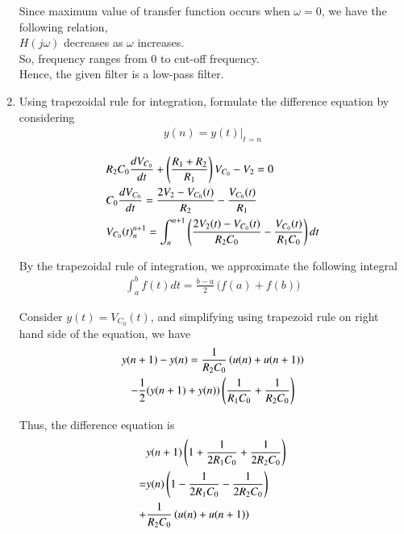 \documentclass[journal,12pt,twocolumn]{IEEEtran}
\renewcommand\thesection{\arabic{section}}
\begin{document}
\begin{enumerate}[label=\arabic*.,ref=\thesection.\theenumi]
Since maximum value of transfer function occurs when $\omega = 0$, we have the following relation, \\
$H(j\omega)$ decreases as $\omega$ increases. \\
So, frequency ranges from $0$ to cut-off frequency. \\
Hence, the given filter is a low-pass filter. 

\item Using trapezoidal rule for integration, formulate the difference equation by considering 
\begin{align}
	y(n) = y(t)\vert_{t=n}
\end{align}

\solution
\begin{align}
	& R_2 C_0 \frac{d V_{C_0}}{dt} + \left(\frac{R_1 + R_2}{R_1}\right) V_{C_0} - V_2 = 0 \\
	&C_0\frac{d V_{C_0}}{dt} = \frac{2V_2 -V_{C_0}(t)}{R_2} - \frac{V_{C_0}(t)}{R_1} \\
 & V_{C_0}(t)^{n+1}_{n} = \int_{n}^{n+1} \left(\frac{2V_2(t) -V_{C_0}(t)}{R_2C_0} - \frac{V_{C_0}(t)}{R_1C_0}\right) dt
\end{align}
	
By the trapezoidal rule of integration, we approximate the following integral
\begin{align}
	\int_a^b f(t) dt = \frac{b-a}{2} \, \biggl( f(a) + f(b) \biggr)
\end{align}
	
Consider $y(t) = V_{C_0}(t)$, and simplifying using trapezoid rule on right hand side of the equation, we have 
\begin{multline}
	y(n+1) - y(n) = \frac{1}{R_2C_0}\left(u(n)+u(n+1)\right) \\
	- \frac12(y(n+1) + y(n))\left(\frac{1}{R_1C_0} + \frac{1}{R_2C_0}\right)
\end{multline}
	
Thus, the difference equation is
\begin{align}
\begin{split}
	&y(n+1) \left(1 + \frac{1}{2R_1C_0} + \frac{1}{2R_2C_0}\right) \\= &y(n) \left(1 - \frac{1}{2R_1C_0} - \frac{1}{2R_2C_0}\right) \\+ &\frac{1}{R_2C_0}\left(u(n)+u(n+1)\right)
\end{split}
\label{eq:diff_eq}
\end{align}



\end{enumerate}
\end{document}
